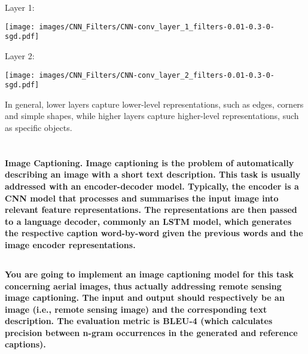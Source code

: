 \documentclass{article}
\begin{document}
Layer 1:
\begin{center}
    \texttt{[image: images/CNN\_Filters/CNN-conv\_layer\_1\_filters-0.01-0.3-0-sgd.pdf]}
\end{center}
Layer 2:
\begin{center}
    \texttt{[image: images/CNN\_Filters/CNN-conv\_layer\_2\_filters-0.01-0.3-0-sgd.pdf]}
\end{center}
In general, lower layers capture lower-level representations, such as edges, corners and simple shapes, while higher layers capture higher-level representations, such as specific objects.

\section{}
\textbf{Image Captioning. Image captioning is the problem of automatically describing an image with a short text description. This task is usually addressed with an encoder-decoder model. Typically, the encoder is a CNN model that processes and summarises the input image into relevant feature representations. The representations are then passed to a language decoder, commonly an LSTM model, which generates the respective caption word-by-word given the previous words and the image encoder representations.}

\subsection{}
\textbf{You are going to implement an image captioning model for this task concerning aerial images, thus actually addressing remote sensing image captioning. The input and output should respectively be an image (i.e., remote sensing image) and the corresponding text description. The evaluation metric is BLEU-4 (which calculates precision between n-gram occurrences in the generated and reference captions).}
\end{document}
